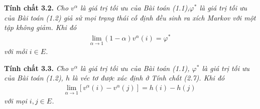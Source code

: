\documentclass[12pt,a4paper]{report}
\begin{document}
    \begin{shaded*}
    	\noindent
    	\textbf{Tính chất 3.2. } \textit{Cho $v^\alpha$ là giá trị tối ưu của Bài toán (1.1),$\varphi^*$ là giá trị tối ưu của Bài toán (1.2)  giả sử mọi trạng thái cố định đều sinh ra xích Markov với một tập không giảm. Khi đó
    		\begin{align*}
    		\underset{\alpha \rightarrow 1}{\mathrm{lim}}(1-\alpha)v^\alpha(i)=\varphi^*
    		\end{align*}
    		với mỗi $i \in E$.
    	} 
    \end{shaded*}   

\begin{shaded*}
	\noindent
	\textbf{Tính chất 3.3. } \textit{Cho $v^\alpha$ là giá trị tối ưu của Bài toán (1.1), $\varphi^*$ là giá trị tối ưu của Bài toán (1.2), $h$ là véc tơ được xác định ở Tính chất (2.7). Khi đó
		\begin{align*}
		\underset{\alpha \rightarrow 1}{\mathrm{lim}}[v^\alpha (i)-v^\alpha (j)]=h(i)-h(j)
		\end{align*}
		với mọi $i,j \in E$.
	} 
\end{shaded*} 
\end{document}

